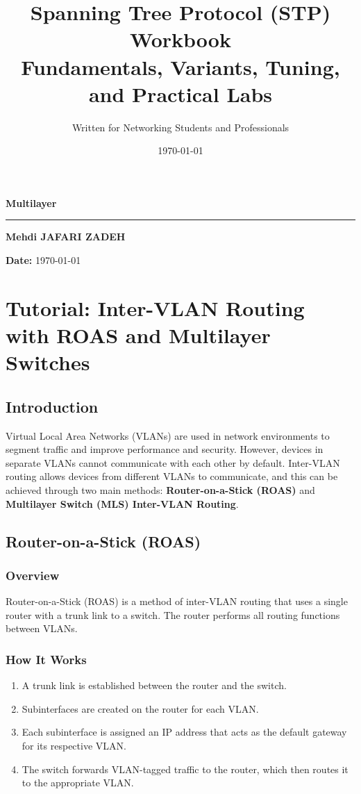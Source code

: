 \documentclass[a4paper]{book}
\title{\Huge \textbf{Spanning Tree Protocol (STP) Workbook}\\
       \Large Fundamentals, Variants, Tuning, and Practical Labs}
\author{\Large Written for Networking Students and Professionals}
\date{\today}
\begin{document}
\begin{titlepage}
    \centering
    \vspace*{4cm}
    {\Huge \textbf{Multilayer}\par}
    \vspace{0.8cm}
    
    \rule{0.9\textwidth}{1pt}
    
    \vspace{0.6cm}
    {\large \textbf{Mehdi JAFARI ZADEH}}\par
    \vspace{0.3cm}
    
    \vfill
    \textbf{Date:} \today
    \vspace{2cm}
\end{titlepage}

\tableofcontents
\newpage

\chapter{Tutorial: Inter-VLAN Routing with ROAS and Multilayer Switches}
\section{Introduction}
Virtual Local Area Networks (VLANs) are used in network environments to segment traffic and improve performance and security. However, devices in separate VLANs cannot communicate with each other by default. Inter-VLAN routing allows devices from different VLANs to communicate, and this can be achieved through two main methods: \textbf{Router-on-a-Stick (ROAS)} and \textbf{Multilayer Switch (MLS) Inter-VLAN Routing}.

\section{Router-on-a-Stick (ROAS)}
\subsection{Overview}
Router-on-a-Stick (ROAS) is a method of inter-VLAN routing that uses a single router with a trunk link to a switch. The router performs all routing functions between VLANs.

\subsection{How It Works}
\begin{enumerate}
    \item A trunk link is established between the router and the switch.
    \item Subinterfaces are created on the router for each VLAN.
    \item Each subinterface is assigned an IP address that acts as the default gateway for its respective VLAN.
    \item The switch forwards VLAN-tagged traffic to the router, which then routes it to the appropriate VLAN.
\end{enumerate}
\end{document}
